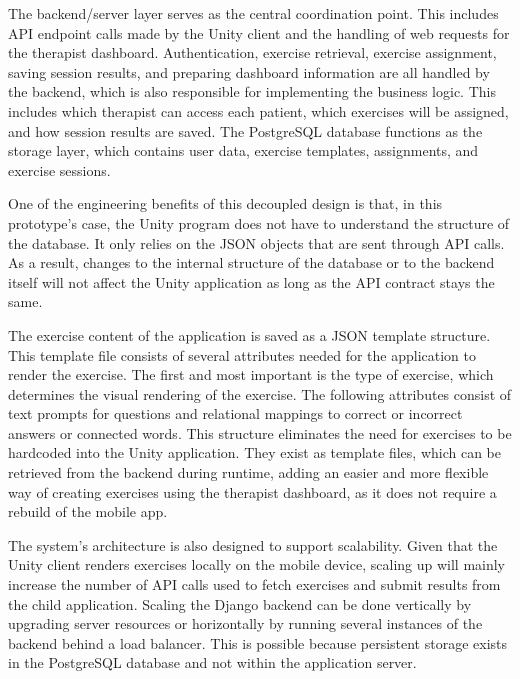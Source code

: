 The backend/server layer serves as the central coordination point. This includes API endpoint calls made by the Unity client and the handling of web requests for the therapist dashboard. Authentication, exercise retrieval, exercise assignment, saving session results, and preparing dashboard information are all handled by the backend, which is also responsible for implementing the business logic. This includes which therapist can access each patient, which exercises will be assigned, and how session results are saved. The PostgreSQL database functions as the storage layer, which contains user data, exercise templates, assignments, and exercise sessions.

One of the engineering benefits of this decoupled design is that, in this prototype's case, the Unity program does not have to understand the structure of the database. It only relies on the JSON objects that are sent through API calls. As a result, changes to the internal structure of the database or to the backend itself will not affect the Unity application as long as the API contract stays the same.

The exercise content of the application is saved as a JSON template structure. This template file consists of several attributes needed for the application to render the exercise. The first and most important is the type of exercise, which determines the visual rendering of the exercise. The following attributes consist of text prompts for questions and relational mappings to correct or incorrect answers or connected words. This structure eliminates the need for exercises to be hardcoded into the Unity application. They exist as template files, which can be retrieved from the backend during runtime, adding an easier and more flexible way of creating exercises using the therapist dashboard, as it does not require a rebuild of the mobile app.

The system's architecture is also designed to support scalability. Given that the Unity client renders exercises locally on the mobile device, scaling up will mainly increase the number of API calls used to fetch exercises and submit results from the child application. Scaling the Django backend can be done vertically by upgrading server resources or horizontally by running several instances of the backend behind a load balancer. This is possible because persistent storage exists in the PostgreSQL database and not within the application server.

